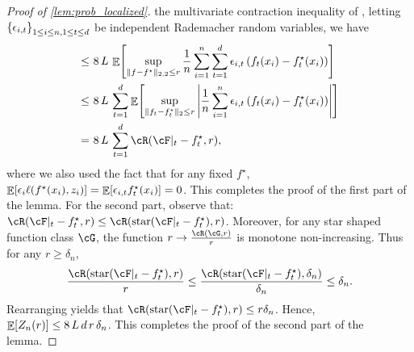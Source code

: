 \documentclass[11pt]{article} %
\newcommand{\pref}[1]{\cref{#1}}
\theoremstyle{theorem}  %
\theoremstyle{plain}
\DeclarePairedDelimiter{\brk}{[}{]}
\DeclarePairedDelimiter{\crl}{\{}{\}}
\DeclareMathOperator{\En}{\mathbb{E}}
\newcommand{\eps}{\epsilon}
\newcommand{\sh}{\ensuremath{\mathrm{star}}}
\newcommand{\rbar}{|}
\newcommand{\vartwo}{x} %
\begin{document}
\begin{proof}[Proof of \pref{lem:prob_localized}]
the multivariate contraction inequality of \cite{maurer2016vector},
letting $\crl*{\eps_{i,t}}_{1\leq{}i\leq{}n, 1\leq{}t\leq{}d}$ be
independent Rademacher random variables, we have
\begin{align*}
\leq~& 8\,L\, \En\brk*{\sup_{\|f-f^{\star}\|_{2,2}\leq r} \frac{1}{n} \sum_{i=1}^n \sum_{t=1}^d \epsilon_{i,t} \left(f_t(\vartwo_i) - f_t^{\star}(\vartwo_i)\right)}\\
\leq~& 8\,L\, \sum_{t=1}^d \En\brk*{\sup_{\|f_t-f_t^{\star}\|_{2}\leq r} \left| \frac{1}{n} \sum_{i=1}^n \epsilon_{i,t} \left(f_t(\vartwo_i) - f_t^{\star}(\vartwo_i)\right)\right|}\\
=~& 8\, L\, \sum_{t=1}^d \cR(\cF\rbar_t-f_t^{\star},r),
\end{align*}
where we also used the fact that for any fixed $f^{\star}$, $\En\brk*{\epsilon_i \ell(f^{\star}(x_i),z_i)} = \En\brk*{\epsilon_{i, t} f_t^{\star}(x_i)}=0$. This completes the proof of the first part of the lemma. For the second part, observe that: $\cR(\cF\rbar_t-f_t^{\star},r)\leq \cR(\sh(\cF\rbar_t - f_t^{\star}),r)$. Moreover, for any star shaped function class $\cG$, the function $r \rightarrow \frac{\cR(\cG,r)}{r}$ is monotone non-increasing. Thus for any $r\geq \delta_n$,
\begin{align*}
\frac{\cR(\sh(\cF\rbar_t - f_t^{\star}),r)}{r} \leq \frac{\cR(\sh(\cF\rbar_t - f_t^{\star}),\delta_n)}{\delta_n} \leq \delta_n.
\end{align*}
Rearranging yields that $\cR(\sh(\cF\rbar_t - f_t^{\star}),r)\leq r \delta_n$. Hence, $\En\brk*{Z_n(r)}\leq 8\, L \, d \, r\, \delta_n$. This completes the proof of the second part of the lemma.
\end{proof}
\end{document}
